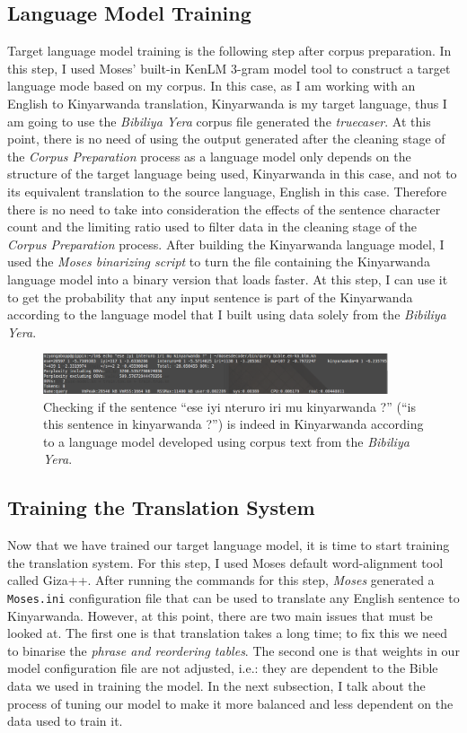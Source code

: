 \subsection{Language Model Training}
Target language model training is the following step after corpus preparation. In this step, I used Moses' built-in KenLM 3-gram model tool to construct a target language mode based on my corpus. In this case, as I am working with an English to Kinyarwanda translation, Kinyarwanda is my target language, thus I am going to use the \textit{Bibiliya Yera} corpus file generated the \textit{truecaser}. At this point, there is no need of using the output generated after the cleaning stage of the \textit{Corpus Preparation} process as a language model only depends on the structure of the target language being used, Kinyarwanda in this case, and not to its equivalent translation to the source language,  English in this case. Therefore there is no need to take into consideration the effects of the sentence character count and the limiting ratio used to filter data in the cleaning stage of the \textit{Corpus Preparation} process. After building the Kinyarwanda language model, I used the \textit{Moses binarizing script} to turn the file containing the Kinyarwanda language model into a binary version that loads faster. At this step, I can use it to get the probability that any input sentence is part of the Kinyarwanda according to the language model that I built using data solely from the \textit{Bibiliya Yera}. 
\begin{figure}[h]
\begin{center}
\includegraphics[width=4in]{figures/testing-a-lm}
\caption{Checking if the sentence ``ese iyi nteruro iri mu kinyarwanda ?'' (``is this sentence in kinyarwanda ?'') is indeed in Kinyarwanda according to a language model developed using corpus text from the \textit{Bibiliya Yera}.}
\end{center}
\end{figure}
\subsection{Training the Translation System}
Now that we have trained our target language model, it is time to start training the translation system. For this step, I used Moses default word-alignment tool called Giza++. After running the commands for this step, \textit{Moses} generated a \texttt{Moses.ini} configuration file that can be used to translate any English sentence to Kinyarwanda. However, at this point, there are two main issues that must be looked at. The first one is that translation takes a long time; to fix this we need to binarise the \textit{phrase and reordering tables}. The second one is that weights in our model configuration file are not adjusted, i.e.: they are dependent to the Bible data we used in training the model. In the next subsection, I talk about the process of tuning our model to make it more balanced and less dependent on the data used to train it.
